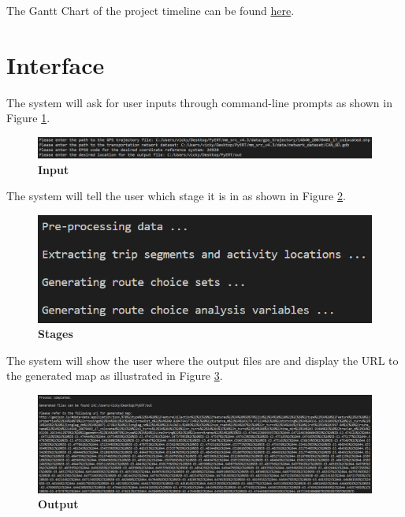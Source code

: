 \documentclass[12pt, titlepage]{article}
\begin{document}
The Gantt Chart of the project timeline can be found \href{https://github.com/paezha/PyERT-BLACK/blob/main/docs/Design/Final%20TRACK.pdf}{here}.

% 


% 


\newpage{}

\appendix

\section{Interface}
\label{UI}
The system will ask for user inputs through command-line prompts as shown in Figure \ref{fig:input}.
\begin{figure}[H]
    \centering
    \includegraphics[scale=0.55]{input.png}
    \caption{\bf Input}
    \label{fig:input}
\end{figure}

The system will tell the user which stage it is in as shown in Figure \ref{fig:stages}.
\begin{figure}[H]
    \centering
    \includegraphics[scale=0.55]{stages.png}
    \caption{\bf Stages}
    \label{fig:stages}
\end{figure}

The system will show the user where the output files are and display the URL to the generated map as illustrated in Figure \ref{fig:output}.
\begin{figure}[H]
    \centering
    \includegraphics[scale=0.4]{output.png}
    \caption{\bf Output}
    \label{fig:output}
\end{figure}
\end{document}
